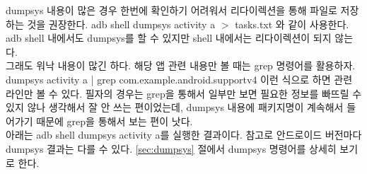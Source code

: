 dumpsys 내용이 많은 경우 한번에 확인하기 어려워서 리다이렉션을 통해 파일로 저장하는 것을 권장한다. adb shell dumpsys activity a  $>$ tasks.txt 와 같이 사용한다. adb shell 내에서도 dumpsys를 할 수 있지만 shell 내에서는 리다이렉션이 되지 않는다.\\

그래도 워낙 내용이 많긴 하다. 해당 앱 관련 내용만 볼 때는 grep 명령어를 활용하자. dumpsys activity a | grep com.example.android.supportv4 이런 식으로 하면 관련 라인만 볼 수 있다. 필자의 경우는 grep을 통해서 일부만 보면 필요한 정보를 빠뜨릴 수 있지 않나 생각해서 잘 안 쓰는 편이었는데, dumpsys 내용에 패키지명이 계속해서 들어가기 때문에 grep을 통해서 보는 편이 낫다.\\

아래는 adb shell dumpsys activity a를 실행한 결과이다. 참고로 안드로이드 버전마다 dumpsys 결과는 다를 수 있다. \ref{sec:dumpsys} 절에서 dumpsys 명령어를 상세히 보기로 한다.
